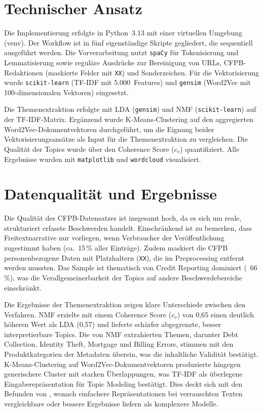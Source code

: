 \documentclass[a4paper,11pt]{article}
\begin{document}
\section{Technischer Ansatz}

Die Implementierung erfolgte in Python~3.13 mit einer virtuellen Umgebung (venv). Der Workflow
ist in fünf eigenständige Skripte gegliedert, die sequentiell ausgeführt werden. Die
Vorverarbeitung nutzt \texttt{spaCy} für Tokenisierung und Lemmatisierung sowie reguläre
Ausdrücke zur Bereinigung von URLs, CFPB-Redaktionen (maskierte Felder mit \texttt{XX}) und
Sonderzeichen. Für die Vektorisierung wurde \texttt{scikit-learn} (TF-IDF mit 5.000~Features)
und \texttt{gensim} (Word2Vec mit 100-dimensionalen Vektoren) eingesetzt.

Die Themenextraktion erfolgte mit LDA (\texttt{gensim}) und NMF (\texttt{scikit-learn}) auf der
TF-IDF-Matrix. Ergänzend wurde K-Means-Clustering auf den aggregierten Word2Vec-Dokumentvektoren
durchgeführt, um die Eignung beider Vektorisierungsansätze als Input für die Themenextraktion
zu vergleichen. Die Qualität der Topics wurde über den Coherence Score ($c_v$) quantifiziert.
Alle Ergebnisse wurden mit \texttt{matplotlib} und \texttt{wordcloud} visualisiert.

\section{Datenqualität und Ergebnisse}

Die Qualität des CFPB-Datensatzes ist insgesamt hoch, da es sich um reale, strukturiert erfasste
Beschwerden handelt. Einschränkend ist zu bemerken, dass Freitextnarrative nur vorliegen, wenn
Verbraucher der Veröffentlichung zugestimmt haben (ca.~15\,\% aller Einträge). Zudem maskiert
die CFPB personenbezogene Daten mit Platzhaltern (\texttt{XX}), die im Preprocessing entfernt
werden mussten. Das Sample ist thematisch von Credit Reporting dominiert (~66\,\%), was die
Verallgemeinerbarkeit der Topics auf andere Beschwerdebereiche einschränkt.

Die Ergebnisse der Themenextraktion zeigen klare Unterschiede zwischen den Verfahren. NMF
erzielte mit einem Coherence Score ($c_v$) von 0,65 einen deutlich höheren Wert als LDA (0,57)
und lieferte schärfer abgegrenzte, besser interpretierbare Topics. Die von NMF extrahierten
Themen, darunter Debt Collection, Identity Theft, Mortgage und Billing Errors, stimmen
mit den Produktkategorien der Metadaten überein, was die inhaltliche Validität bestätigt.
K-Means-Clustering auf Word2Vec-Dokumentvektoren produzierte hingegen generischere Cluster
mit starken Überlappungen, was TF-IDF als überlegene Eingaberepräsentation für Topic Modeling
bestätigt. Dies deckt sich mit den Befunden von \textcite[S.~213]{wang2020empirical}, wonach
einfachere Repräsentationen bei verrauschten Texten vergleichbare oder bessere Ergebnisse
liefern als komplexere Modelle.
\end{document}
